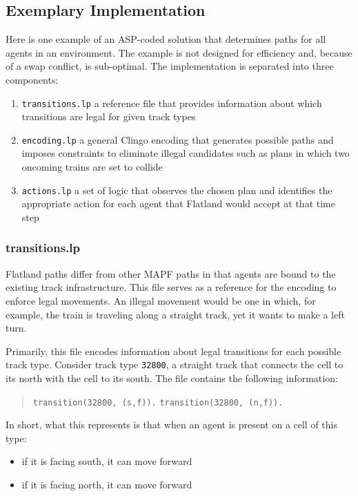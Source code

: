\documentclass[11pt]{article}
\begin{document}
\subsection{Exemplary Implementation}
Here is one example of an ASP-coded solution that determines paths for all agents in an environment. The example is not designed for efficiency and, because of a swap conflict, is sub-optimal.  The implementation is separated into three components:
\begin{enumerate}
	\item \texttt{transitions.lp} a reference file that provides information about which transitions are legal for given track types
	\item \texttt{encoding.lp} a general Clingo encoding that generates possible paths and imposes constraints to eliminate illegal candidates such as plans in which two oncoming trains are set to collide
	\item \texttt{actions.lp} a set of logic that observes the chosen plan and identifies the appropriate action for each agent that Flatland would accept at that time step
\end {enumerate}

\subsubsection{transitions.lp}
Flatland paths differ from other MAPF paths in that agents are bound to the existing track infrastructure. This file serves as a reference for the encoding to enforce legal movements. An illegal movement would be one in which, for example, the train is traveling along a straight track, yet it wants to make a left turn.

Primarily, this file encodes information about legal transitions for each possible track type. Consider track type \texttt{32800}, a straight track that connects the cell to its north with the cell to its south. The file contains the following information:

\begin{quote}
	\texttt{transition(32800, (s,f)).} \texttt{transition(32800, (n,f)).}
\end{quote}

\noindent  In short, what this represents is that when an agent is present on a cell of this type:

\begin{itemize}
	\item if it is facing south, it can move forward
	\item if it is facing north, it can move forward
\end {itemize}
\end{document}
